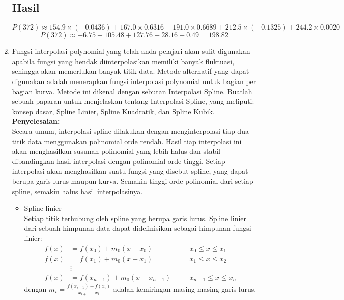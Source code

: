 \documentclass{article}
\newcommand{\penyelesaian}{\textbf{Penyelesaian: }}
\begin{document}
\begin{enumerate}
    \subsection*{Hasil}
    \[
    P(372) \approx 154.9 \times (-0.0436) + 167.0 \times 0.6316 + 191.0 \times 0.6689 + 212.5 \times (-0.1325) + 244.2 \times 0.0020
    \]
    \[
    P(372) \approx -6.75 + 105.48 + 127.76 - 28.16 + 0.49 = \boxed{198.82}
    \]

    \item Fungsi interpolasi polynomial yang telah anda pelajari akan sulit digunakan apabila fungsi yang hendak diinterpolasikan memiliki banyak fluktuasi, sehingga akan memerlukan banyak titik data.
    Metode alternatif yang dapat digunakan adalah menerapkan fungsi interpolasi polynomial untuk bagian per bagian kurva. 
    Metode ini dikenal dengan sebutan Interpolasi Spline. Buatlah sebuah paparan untuk menjelaskan tentang Interpolasi Spline, yang meliputi: konsep dasar, Spline Linier, Spline Kuadratik, dan Spline Kubik. \\
    \penyelesaian \\
    Secara umum, interpolasi spline dilakukan dengan menginterpolasi tiap dua titik data menggunakan polinomial orde rendah. 
    Hasil tiap interpolasi ini akan menghasilkan susunan polinomial yang lebih halus dan stabil dibandingkan hasil interpolasi dengan polinomial orde tinggi.
    Setiap interpolasi akan menghasilkan suatu fungsi yang disebut spline, yang dapat berupa garis lurus maupun kurva. 
    Semakin tinggi orde polinomial dari setiap spline, semakin halus hasil interpolasinya. 

    \begin{itemize}
        \item Spline linier \\
        Setiap titik terhubung oleh spline yang berupa garis lurus. Spline linier dari sebuah himpunan data dapat didefinisikan sebagai himpunan fungsi linier:
        \begin{align*}
            f(x) &= f(x_0) + m_0(x - x_0) \quad && x_0 \leq x \leq x_1 \\
            f(x) &= f(x_1) + m_0(x - x_1) \quad && x_1 \leq x \leq x_2 \\
            &\vdots && \\
            f(x) &= f(x_{n-1}) + m_0(x - x_{n-1}) \quad && x_{n-1} \leq x \leq x_n
        \end{align*}
        dengan $m_i = \frac{f(x_{i+1}) - f(x_i)}{x_{i+1} - x_i}$ adalah kemiringan masing-masing garis lurus.


\end{itemize}
\end{enumerate}
\end{document}

